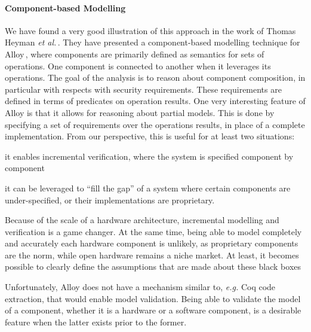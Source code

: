 \paragraph{Component-based Modelling}
%
We have found a very good illustration of this approach in the work of Thomas
Heyman \emph{et al.}\,\cite{heyman2012securemodel}.
%
They have presented a component-based modelling technique for
Alloy\,\cite{jackson2012alloy}, where components are primarily defined as semantics for sets of operations.
%
One component is connected to another when it leverages its operations.
%
The goal of the analysis is to reason about component composition, in particular
with respects with security requirements.
%
These requirements are defined in terms of predicates on operation results.
%
One very interesting feature of Alloy is that it allows for reasoning about
partial models.
%
This is done by specifying a set of requirements over the operations results, in
place of a complete implementation.
%
From our perspective, this is useful for at least two situations:
%
\begin{inparaenum}[(1)]
\item it enables incremental verification, where the system is specified
  component by component
%
\item it can be leveraged to ``fill the gap'' of a system where certain
  components are under-specified, or their implementations are proprietary.
%
\end{inparaenum}
%
Because of the scale of a hardware architecture, incremental modelling and
verification is a game changer.
%
At the same time, being able to model completely and accurately each hardware
component is unlikely, as proprietary components are the norm, while open
hardware remains a niche market.
%
At least, it becomes possible to clearly define the assumptions that are made
about these black boxes

Unfortunately, Alloy does not have a mechanism similar to, \emph{e.g.} Coq code
extraction, that would enable model validation.
%
Being able to validate the model of a component, whether it is a hardware or a
software component, is a desirable feature when the latter exists prior to the
former.

